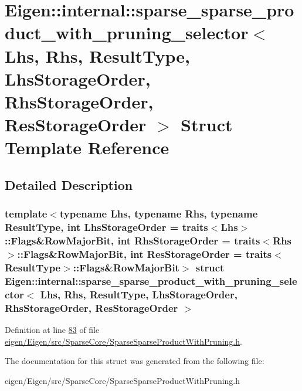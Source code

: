 \hypertarget{struct_eigen_1_1internal_1_1sparse__sparse__product__with__pruning__selector}{}\section{Eigen\+:\+:internal\+:\+:sparse\+\_\+sparse\+\_\+product\+\_\+with\+\_\+pruning\+\_\+selector$<$ Lhs, Rhs, Result\+Type, Lhs\+Storage\+Order, Rhs\+Storage\+Order, Res\+Storage\+Order $>$ Struct Template Reference}
\label{struct_eigen_1_1internal_1_1sparse__sparse__product__with__pruning__selector}


\subsection{Detailed Description}
\subsubsection*{template$<$typename Lhs, typename Rhs, typename Result\+Type, int Lhs\+Storage\+Order = traits$<$\+Lhs$>$\+::\+Flags\&\+Row\+Major\+Bit, int Rhs\+Storage\+Order = traits$<$\+Rhs$>$\+::\+Flags\&\+Row\+Major\+Bit, int Res\+Storage\+Order = traits$<$\+Result\+Type$>$\+::\+Flags\&\+Row\+Major\+Bit$>$\newline
struct Eigen\+::internal\+::sparse\+\_\+sparse\+\_\+product\+\_\+with\+\_\+pruning\+\_\+selector$<$ Lhs, Rhs, Result\+Type, Lhs\+Storage\+Order, Rhs\+Storage\+Order, Res\+Storage\+Order $>$}



Definition at line \hyperlink{eigen_2_eigen_2src_2_sparse_core_2_sparse_sparse_product_with_pruning_8h_source_l00083}{83} of file \hyperlink{eigen_2_eigen_2src_2_sparse_core_2_sparse_sparse_product_with_pruning_8h_source}{eigen/\+Eigen/src/\+Sparse\+Core/\+Sparse\+Sparse\+Product\+With\+Pruning.\+h}.



The documentation for this struct was generated from the following file\+:\begin{DoxyCompactItemize}
\item 
eigen/\+Eigen/src/\+Sparse\+Core/\+Sparse\+Sparse\+Product\+With\+Pruning.\+h\end{DoxyCompactItemize}
